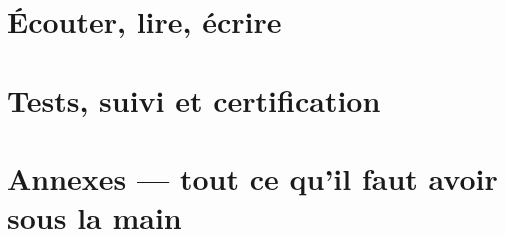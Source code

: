\documentclass[11pt,a4paper,oneside]{book}
\begin{document}
\part{Écouter, lire, écrire}




\part{Tests, suivi et certification}


\appendix
\part*{Annexes \mdseries\small--- tout ce qu'il faut avoir sous la main}








\backmatter
\end{document}
